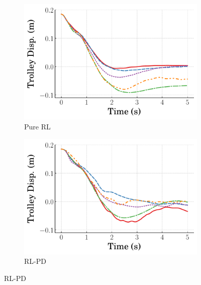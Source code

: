\begin{figure}[tb]
    \centering
    \begin{subfigure}[b]{0.49\textwidth}
        \centering
        \includegraphics[width=\textwidth]{figures/figures_RL_model_based_control/time_responses_crane/dpcrane_pure_RL/Cart_displacement_0p185_init_300000_steps.pdf}
        \caption{Pure RL}
        \label{subfig_chap2:dpcrane_trolley_resp_300000steps_pure_RL}
    \end{subfigure}
    \hfill
    \begin{subfigure}[b]{0.49\textwidth}
	    \centering
	    \includegraphics[width=\textwidth]{figures/figures_RL_model_based_control/time_responses_crane/dpcrane_cont_gain_sched/Cart_displacement_0p185_init_300000_steps.pdf}
	    \caption{RL-PD}
	    \label{subfig_chap2:dpcrane_trolley_resp_300000steps_gain_sched}
    \end{subfigure}

\end{figure}
